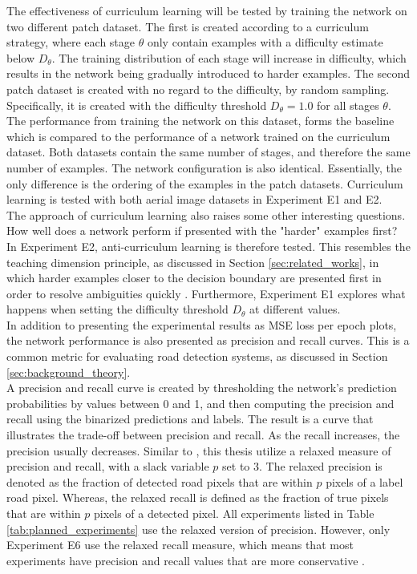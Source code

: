 The effectiveness of curriculum learning will be tested by training the network on two different patch dataset. The first is created according to a curriculum strategy, where each stage $\theta$ only contain examples with a difficulty estimate below $D_\theta$. The training distribution of each stage will increase in difficulty, which results in the network being gradually introduced to harder examples. The second patch dataset is created with no regard to the difficulty, by random sampling. Specifically, it is created with the difficulty threshold $D_\theta =1.0$ for all stages $\theta$. The performance from training the network on this dataset, forms the baseline which is compared to the performance of a network trained on the curriculum dataset. Both datasets contain the same number of stages, and therefore the same number of examples. The network configuration is also identical. Essentially, the only difference is the ordering of the examples in the patch datasets. Curriculum learning is tested with both aerial image datasets in Experiment E1 and E2.\\

The approach of curriculum learning also raises some other interesting questions. How well does a network perform if presented with the "harder" examples first? In Experiment E2, anti-curriculum learning is therefore tested. This resembles the teaching dimension principle, as discussed in Section \ref{sec:related_works}, in which harder examples closer to the decision boundary are presented first in order to resolve ambiguities quickly . Furthermore, Experiment E1 explores what happens when setting the difficulty threshold $D_\theta$ at different values.\\

In addition to presenting the experimental results as \ac{MSE} loss per epoch plots, the network performance is also presented as precision and recall curves. This is a common metric for evaluating road detection systems, as discussed in Section \ref{sec:background_theory}.\\

A precision and recall curve is created by thresholding the network's prediction probabilities by values between 0 and 1, and then computing the precision and recall using the binarized predictions and labels. The result is a curve that illustrates the trade-off between precision and recall. As the recall increases, the precision usually decreases. Similar to \citep{Mnih_aerial_images_noisy}, this thesis utilize a relaxed measure of precision and recall, with a slack variable $p$ set to 3. The relaxed precision is denoted as the fraction of detected road pixels that are within $p$ pixels of a label road pixel. Whereas, the relaxed recall is defined as the fraction of true pixels that are within $p$ pixels of a detected pixel. All experiments listed in Table \ref{tab:planned_experiments} use the relaxed version of precision. However, only Experiment E6 use the relaxed recall measure, which means that most experiments have precision and recall values that are more conservative .\\

